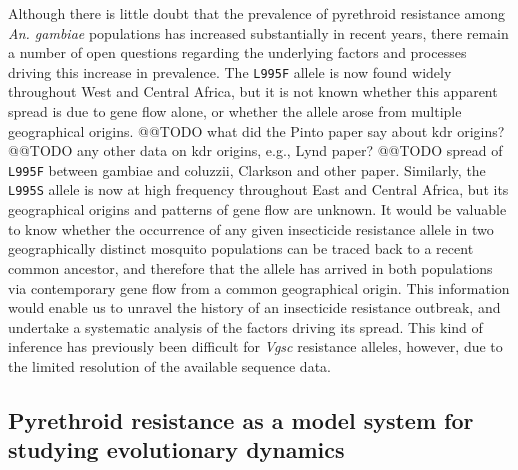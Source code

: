 \documentclass[a4paper,11pt,abstracton,hidelinks]{scrartcl}
\newcommand{\agam}{\textit{An. gambiae}\xspace}
\newcommand{\vgsc}{\textit{Vgsc}\xspace}
\begin{document}
%
Although there is little doubt that the prevalence of pyrethroid resistance among \agam populations has increased substantially in recent years, there remain a number of open questions regarding the underlying factors and processes driving this increase in prevalence.
%
The \texttt{L995F} allele is now found widely throughout West and Central Africa, but it is not known whether this apparent spread is due to gene flow alone, or whether the allele arose from multiple geographical origins.
%
@@TODO what did the Pinto paper say about kdr origins? @@TODO any other data on kdr origins, e.g., Lynd paper?
%
@@TODO spread of \texttt{L995F} between gambiae and coluzzii, Clarkson and other paper.
%
Similarly, the \texttt{L995S} allele is now at high frequency throughout East and Central Africa, but its geographical origins and patterns of gene flow are unknown.
%
It would be valuable to know whether the occurrence of any given insecticide resistance allele in two geographically distinct mosquito populations can be traced back to a recent common ancestor, and therefore that the allele has arrived in both populations via contemporary gene flow from a common geographical origin.
%
This information would enable us to unravel the history of an insecticide resistance outbreak, and undertake a systematic analysis of the factors driving its spread.
%
This kind of inference has previously been difficult for \vgsc resistance alleles, however, due to the limited resolution of the available sequence data.


\subsection*{Pyrethroid resistance as a model system for studying evolutionary dynamics}
\end{document}
